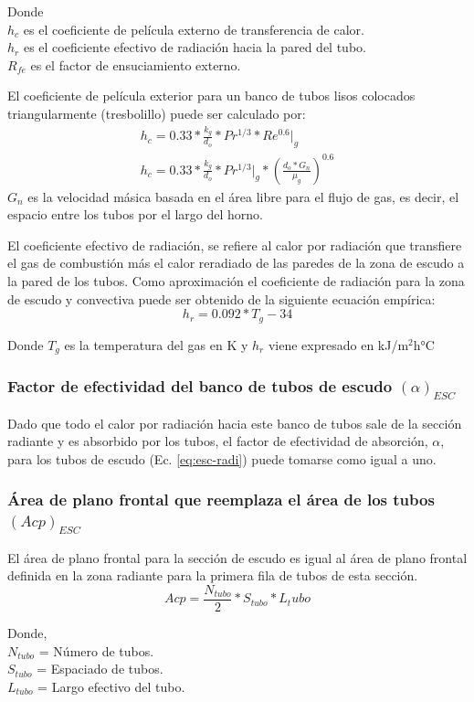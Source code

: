 \par Donde \\
$h_c$ es el coeficiente de película externo de transferencia de calor.\\
$h_r$ es el coeficiente efectivo de radiación hacia la pared del tubo.\\
$R_{fe}$ es el factor de ensuciamiento externo.\\
\par El coeficiente de película exterior para un banco de tubos lisos colocados triangularmente (tresbolillo) puede ser calculado por:
\begin{equation}
\label{eq:hc}
\begin{gathered}
h_c = 0.33 * \frac{k_g}{d_o} *Pr^{1/3} *Re^{0.6} |_g\\
h_c = 0.33 * \frac{k_g}{d_o} *Pr^{1/3}|_g*(\frac{d_o*G_n}{\mu_g})^{0.6}
\end{gathered}
\end{equation}
$G_n$ es la velocidad másica basada en el área libre para el flujo de gas, es decir, el espacio entre los tubos por el largo del horno.
\par El coeficiente efectivo de radiación, se refiere al calor por radiación que transfiere el gas de combustión más el calor reradiado de las paredes de la zona de escudo a la pared de los tubos. Como aproximación el coeficiente de radiación para la zona de escudo y convectiva puede ser obtenido de la siguiente ecuación empírica:
\begin{equation}
\label{eq:hr}
h_r = 0.092*T_g - 34  
\end{equation}
\par Donde $T_g$ es la temperatura del gas en K y $h_r$ viene expresado en kJ/m$^2$h°C

\subsubsection{Factor de efectividad del banco de tubos de escudo $(\alpha)_{ESC}$}
\par Dado que todo el calor por radiación hacia este banco de tubos sale de la sección radiante y es absorbido por los tubos, el factor de efectividad de absorción, $\alpha$, para los tubos de escudo (Ec. \ref{eq:esc-radi}) puede tomarse como igual a uno.

\subsubsection{Área de plano frontal que reemplaza el área de los tubos $(Acp)_{ESC}$}
\par El área de plano frontal para la sección de escudo es igual al área de plano frontal definida en la zona radiante para la primera fila de tubos de esta sección.
\begin{equation}
Acp = \frac{N_{tubo}}{2} * S_{tubo} * {L_tubo}
\end{equation}
\par Donde, \\
$N_{tubo}$ = Número de tubos. \\
$S_{tubo}$ = Espaciado de tubos. \\
$L_{tubo}$ = Largo efectivo del tubo.

